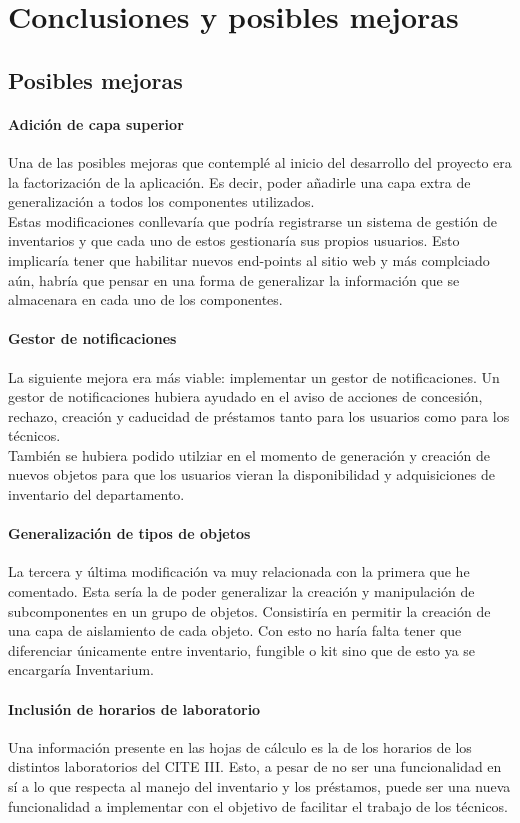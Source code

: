 \chapter{Conclusiones y posibles mejoras}
\section{Posibles mejoras}
\subsubsection{Adición de capa superior}
Una de las posibles mejoras que contemplé al inicio del desarrollo del proyecto era la factorización de la aplicación. Es decir, poder añadirle una capa extra de generalización a todos los componentes utilizados.
\\Estas modificaciones conllevaría que podría registrarse un sistema de gestión de inventarios y que cada uno de estos gestionaría sus propios usuarios. Esto implicaría tener que habilitar nuevos end-points al sitio web y más complciado aún, habría que pensar en una forma de generalizar la información que se almacenara en cada uno de los componentes.
\subsubsection{Gestor de notificaciones}
La siguiente mejora era más viable: implementar un gestor de notificaciones. Un gestor de notificaciones hubiera ayudado en el aviso de acciones de concesión, rechazo, creación y caducidad de préstamos tanto para los usuarios como para los técnicos.
\\También se hubiera podido utilziar en el momento de generación y creación de nuevos objetos para que los usuarios vieran la disponibilidad y adquisiciones de inventario del departamento.
\subsubsection{Generalización de tipos de objetos}
La tercera y última modificación va muy relacionada con la primera que he comentado. Esta sería la de poder generalizar la creación y manipulación de subcomponentes en un grupo de objetos. Consistiría en permitir la creación de una capa de aislamiento de cada objeto. Con esto no haría falta tener que diferenciar únicamente entre inventario, fungible o kit sino que de esto ya se encargaría Inventarium.
\subsubsection{Inclusión de horarios de laboratorio}
Una información presente en las hojas de cálculo es la de los horarios de los distintos laboratorios del CITE III. Esto, a pesar de no ser una funcionalidad en sí a lo que respecta al manejo del inventario y los préstamos, puede ser una nueva funcionalidad a implementar con el objetivo de facilitar el trabajo de los técnicos.

